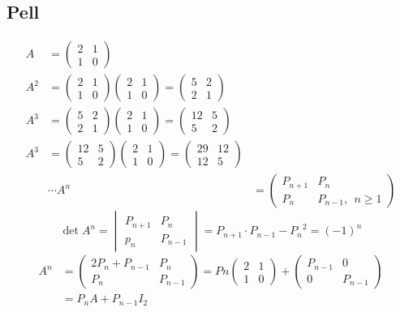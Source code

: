 \documentclass[12pt]{article}
\theoremstyle{definition}
\begin{document}
\subsection*{Pell}
\[\begin{aligned}
A \ &=\begin{pmatrix}
2&1\\
1&0
\end{pmatrix}\\
A^2 &= \begin{pmatrix}
2&1\\
1&0
\end{pmatrix}\begin{pmatrix}
2&1\\
1&0
\end{pmatrix}=\begin{pmatrix}
5&2\\
2&1
\end{pmatrix}\\
A^3 &=  \begin{pmatrix}
5&2\\
2&1
\end{pmatrix}\begin{pmatrix}
2&1\\
1&0
\end{pmatrix}=\begin{pmatrix}
12&5\\
5&2
\end{pmatrix}\\
A^3 &= \begin{pmatrix}
12&5\\
5&2
\end{pmatrix}\begin{pmatrix}
2&1\\
1&0
\end{pmatrix}=\begin{pmatrix}
29&12\\
12&5
\end{pmatrix}\\
&\cdots
A^n &= \begin{pmatrix}
P_{n+1}&P_n\\
P_n&P_{n-1}, \ \ n \ge 1
\end{pmatrix} 
\end{aligned}\]
$$\det{A^n} = \begin{vmatrix}
P_{n+1}&P_n\\
p_n & P_{n-1}
\end{vmatrix}= P_{n+1}\cdot P_{n-1} - {P_n}^2 = (-1)^n$$
\[\begin{aligned}
A^n &= \begin{pmatrix}
2P_n + P_{n-1}& P_n\\
P_n&P_{n-1}
\end{pmatrix}=Pn\begin{pmatrix}
2&1\\
1&0
\end{pmatrix}+\begin{pmatrix}
P_{n-1}&0\\
0&P_{n-1}
\end{pmatrix}\\
&= P_n A+P_{n-1}I_2 
\end{aligned}\]
\end{document}
